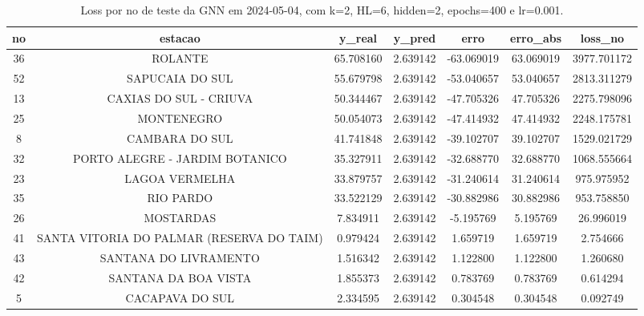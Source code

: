 \begin{table}[h]
\centering
\caption{Loss por no de teste da GNN em 2024-05-04, com k=2, HL=6, hidden=2, epochs=400 e lr=0.001.}
\label{tab:gnn_loss_k2_hl6_h2_e400_d20240504}
\begin{tabular}{ccccccc}
\toprule
no & estacao & y\_real & y\_pred & erro & erro\_abs & loss\_no \\
\midrule
36 & ROLANTE & 65.708160 & 2.639142 & -63.069019 & 63.069019 & 3977.701172 \\
52 & SAPUCAIA DO SUL & 55.679798 & 2.639142 & -53.040657 & 53.040657 & 2813.311279 \\
13 & CAXIAS DO SUL - CRIUVA & 50.344467 & 2.639142 & -47.705326 & 47.705326 & 2275.798096 \\
25 & MONTENEGRO & 50.054073 & 2.639142 & -47.414932 & 47.414932 & 2248.175781 \\
8 & CAMBARA DO SUL & 41.741848 & 2.639142 & -39.102707 & 39.102707 & 1529.021729 \\
32 & PORTO ALEGRE - JARDIM BOTANICO & 35.327911 & 2.639142 & -32.688770 & 32.688770 & 1068.555664 \\
23 & LAGOA VERMELHA & 33.879757 & 2.639142 & -31.240614 & 31.240614 & 975.975952 \\
35 & RIO PARDO & 33.522129 & 2.639142 & -30.882986 & 30.882986 & 953.758850 \\
26 & MOSTARDAS & 7.834911 & 2.639142 & -5.195769 & 5.195769 & 26.996019 \\
41 & SANTA VITORIA DO PALMAR (RESERVA DO TAIM) & 0.979424 & 2.639142 & 1.659719 & 1.659719 & 2.754666 \\
43 & SANTANA DO LIVRAMENTO & 1.516342 & 2.639142 & 1.122800 & 1.122800 & 1.260680 \\
42 & SANTANA DA BOA VISTA & 1.855373 & 2.639142 & 0.783769 & 0.783769 & 0.614294 \\
5 & CACAPAVA DO SUL & 2.334595 & 2.639142 & 0.304548 & 0.304548 & 0.092749 \\
\bottomrule
\end{tabular}
\end{table}

